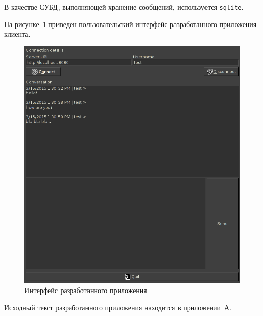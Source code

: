 В качестве СУБД, выполняющей хранение сообщений, используется \texttt{sqlite}.

На рисунке~\ref{pic:interface} приведен пользовательский интерфейс
разработанного приложения-клиента.

\begin{figure}[h!]
  \centering
  \includegraphics[width=150mm]{pic/interface}
  \caption{Интерфейс разработанного приложения}
  \label{pic:interface}
\end{figure}

Исходный текст разработанного приложения находится в приложении~А.